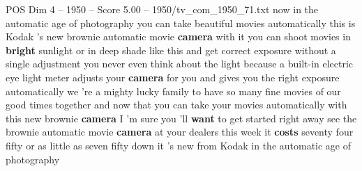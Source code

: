 \begin{textsample}{POS Dim 4 – 1950 – Score 5.00 – 1950/tv\_com\_1950\_71.txt}  \label{ex:f4_pos_083}
now in the automatic age of photography you can take beautiful movies automatically this is Kodak 's new brownie automatic movie \textbf{camera} with it you can shoot movies in \textbf{bright} sunlight or in deep shade like this and get correct exposure without a single adjustment you never even think about the light because a built-in electric eye light meter adjusts your \textbf{camera} for you and gives you the right exposure automatically we 're a mighty lucky family to have so many fine movies of our good times together and now that you can take your movies automatically with this new brownie \textbf{camera} I 'm sure you 'll \textbf{want} to get started right away see the brownie automatic movie \textbf{camera} at your dealers this week it \textbf{costs} seventy four fifty or as little as seven fifty down it 's new from Kodak in the automatic age of photography

\end{textsample}
